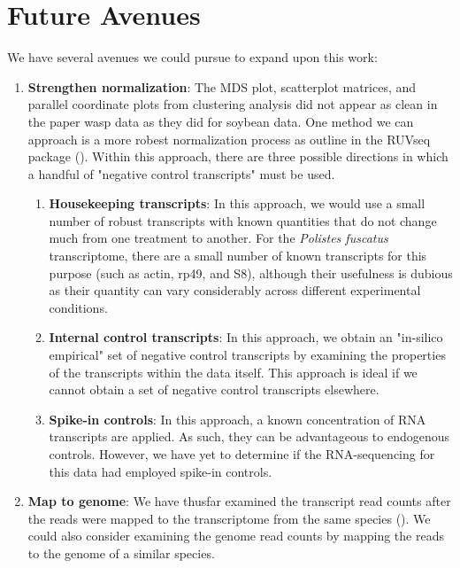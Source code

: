 \documentclass[11pt,a4paper,oldfontcommands,openany]{memoir}
\numberwithin{equation}{section} %
\begin{document}
\section{Future Avenues}

We have several avenues we could pursue to expand upon this work:

\begin{enumerate}
\item \textbf{Strengthen normalization}: The MDS plot, scatterplot matrices, and parallel coordinate plots from clustering analysis did not appear as clean in the paper wasp data as they did for soybean data. One method we can approach is a more robest normalization process as outline in the RUVseq package (\citealt{ruvseq}). Within this approach, there are three possible directions in which a handful of "negative control transcripts" must be used.

\begin{enumerate}
\item \textbf{Housekeeping transcripts}: In this approach, we would use a small number of robust transcripts with known quantities that do not change much from one treatment to another. For the \textit{Polistes fuscatus} transcriptome, there are a small number of known transcripts for this purpose (such as actin, rp49, and S8), although their usefulness is dubious as their quantity can vary considerably across different experimental conditions.
\item \textbf{Internal control transcripts}: In this approach, we obtain an "in-silico empirical" set of negative control transcripts by examining the properties of the transcripts within the data itself. This approach is ideal if we cannot obtain a set of negative control transcripts elsewhere.
\item \textbf{Spike-in controls}: In this approach, a known concentration of RNA transcripts are applied. As such, they can be advantageous to endogenous controls. However, we have yet to determine if the RNA-sequencing for this data had employed spike-in controls. 
\end{enumerate}

\item \textbf{Map to genome}: We have thusfar examined the transcript read counts after the reads were mapped to the transcriptome from the same species (\citealt{pw19}). We could also consider examining the genome read counts by mapping the reads to the genome of a similar species.


\end{enumerate}
\end{document}
